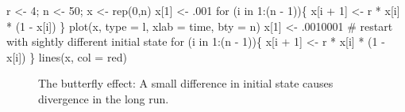 \documentclass[
  a4paper,
  DIV=11,
  numbers=noendperiod,
  oneside]{scrreprt}
\newenvironment{Shaded}{}{}
\newcommand{\AttributeTok}[1]{\textcolor[rgb]{0.84,0.23,0.29}{#1}}
\newcommand{\CommentTok}[1]{\textcolor[rgb]{0.42,0.45,0.49}{#1}}
\newcommand{\ControlFlowTok}[1]{\textcolor[rgb]{0.84,0.23,0.29}{#1}}
\newcommand{\DecValTok}[1]{\textcolor[rgb]{0.00,0.36,0.77}{#1}}
\newcommand{\FunctionTok}[1]{\textcolor[rgb]{0.44,0.26,0.76}{#1}}
\newcommand{\NormalTok}[1]{\textcolor[rgb]{0.14,0.16,0.18}{#1}}
\newcommand{\OtherTok}[1]{\textcolor[rgb]{0.44,0.26,0.76}{#1}}
\newcommand{\SpecialCharTok}[1]{\textcolor[rgb]{0.00,0.36,0.77}{#1}}
\newcommand{\StringTok}[1]{\textcolor[rgb]{0.01,0.18,0.38}{#1}}
\begin{document}
\begin{Shaded}
\begin{Highlighting}[]
\NormalTok{r }\OtherTok{\textless{}{-}} \DecValTok{4}\NormalTok{;  n }\OtherTok{\textless{}{-}} \DecValTok{50}\NormalTok{; x }\OtherTok{\textless{}{-}} \FunctionTok{rep}\NormalTok{(}\DecValTok{0}\NormalTok{,n)}
\NormalTok{x[}\DecValTok{1}\NormalTok{] }\OtherTok{\textless{}{-}}\NormalTok{ .}\DecValTok{001}
\ControlFlowTok{for}\NormalTok{ (i }\ControlFlowTok{in} \DecValTok{1}\SpecialCharTok{:}\NormalTok{(n }\SpecialCharTok{{-}} \DecValTok{1}\NormalTok{))\{}
\NormalTok{  x[i }\SpecialCharTok{+} \DecValTok{1}\NormalTok{] }\OtherTok{\textless{}{-}}\NormalTok{ r }\SpecialCharTok{*}\NormalTok{ x[i] }\SpecialCharTok{*}\NormalTok{ (}\DecValTok{1} \SpecialCharTok{{-}}\NormalTok{ x[i])}
\NormalTok{\}}
\FunctionTok{plot}\NormalTok{(x, }\AttributeTok{type =} \StringTok{\textquotesingle{}l\textquotesingle{}}\NormalTok{, }\AttributeTok{xlab =} \StringTok{\textquotesingle{}time\textquotesingle{}}\NormalTok{, }\AttributeTok{bty =} \StringTok{\textquotesingle{}n\textquotesingle{}}\NormalTok{)}
\NormalTok{x[}\DecValTok{1}\NormalTok{] }\OtherTok{\textless{}{-}}\NormalTok{ .}\DecValTok{0010001}
\CommentTok{\# restart with sightly different initial state}
\ControlFlowTok{for}\NormalTok{ (i }\ControlFlowTok{in} \DecValTok{1}\SpecialCharTok{:}\NormalTok{(n }\SpecialCharTok{{-}} \DecValTok{1}\NormalTok{))\{}
\NormalTok{  x[i }\SpecialCharTok{+} \DecValTok{1}\NormalTok{] }\OtherTok{\textless{}{-}}\NormalTok{ r }\SpecialCharTok{*}\NormalTok{ x[i] }\SpecialCharTok{*}\NormalTok{ (}\DecValTok{1} \SpecialCharTok{{-}}\NormalTok{ x[i])}
\NormalTok{\}}
\FunctionTok{lines}\NormalTok{(x, }\AttributeTok{col =} \StringTok{\textquotesingle{}red\textquotesingle{}}\NormalTok{)}
\end{Highlighting}
\end{Shaded}

\begin{figure}


\caption{\label{fig-ch2-img6}The butterfly effect: A small difference in
initial state causes divergence in the long run.}

\end{figure}%
\end{document}
